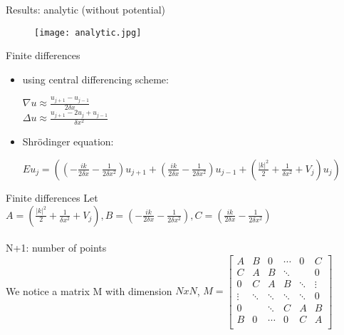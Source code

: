 \documentclass{beamer}
\begin{document}
\begin{frame}{Results: analytic (without potential) }
     \begin{figure}
        \texttt{[image: analytic.jpg]} 
    \end{figure}
    
\end{frame}

\begin{frame}{Finite differences}
\begin{itemize}
    \item using central differencing scheme:
    \begin{center}
        $\nabla u \approx \frac{u_{j+1} - u_{j-1} }{ 2 \delta x}$ \\
        $\Delta u \approx \frac{u_{j+1} -2 u_j + u_{j-1} }{ \delta x^2} $
    \end{center}

    \item Shr\"odinger equation:

        $ E u_j  = \left( (  - \frac{ik}{2\delta x } -\frac{1}{2\delta x^2}) u_{j+1} + (\frac{ik}{2\delta x} - \frac{1}{2\delta x^2}) u_{j-1} + ( \frac{|k|^2}{2} + \frac{1}{\delta x^2} + V_j) u_j
        \right) $
\end{itemize}
\end{frame}
    
\begin{frame}{Finite differences}
Let $A= ( \frac{|k|^2}{2} + \frac{1}{\delta x^2} +V_j ) , B = (  - \frac{ik}{2\delta x } -\frac{1}{2\delta x^2} ), C = (\frac{ik}{2\delta x} - \frac{1}{2\delta x^2}) $ ~~\\ 
~~\\ 
N+1: number of points  \\
We notice a matrix M with dimension $NxN$, $M = \begin{bmatrix}
A  & B     & 0      &  \cdots      & 0     & C  \\
C  & A     & B      & \ddots &       & 0 \\
0 & C & A & B & \ddots &  \vdots  \\
\vdots   & \ddots & \ddots & \ddots & \ddots & 0  \\
0  &        & \ddots & C & A & B \\
B & 0      &   \cdots     & 0     & C      & A \\
\end{bmatrix}$

\end{frame}
\end{document}
